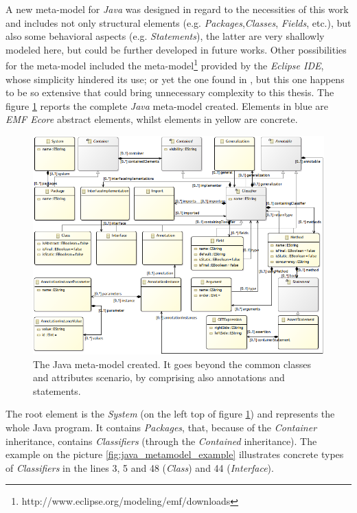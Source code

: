 \documentclass[tuberlin,cic,tc,english,noabntcite]{iiufrgs}
\begin{document}
A new meta-model for \emph{Java} was designed in regard to the necessities of this work and includes not only structural elements (e.g. \emph{Packages},\emph{Classes}, \emph{Fields}, etc.), but also some behavioral aspects (e.g. \emph{Statements}), the latter are very shallowly modeled here, but could be further developed in future works. Other possibilities for the meta-model included the meta-model\footnote{http://www.eclipse.org/modeling/emf/downloads} provided by the \emph{Eclipse IDE}, whose simplicity hindered its use; or yet the one found in \citet{heidenreich2010closing}, but this one happens to be so extensive that could bring unnecessary complexity to this thesis. The figure \ref{fig:java_metamodel} reports the complete \emph{Java} meta-model created. Elements in blue are \emph{EMF Ecore} abstract elements, whilst elements in yellow are concrete.

\begin{figure}[h]
    \caption{The Java meta-model created. It goes beyond the common classes and attributes scenario, by comprising also annotations and statements.}
    \begin{center}
        \includegraphics[width=\textwidth]{javaMetamodel}
    \end{center}
    \label{fig:java_metamodel}
\end{figure}

The root element is the \emph{System} (on the left top of figure \ref{fig:java_metamodel}) and represents the whole Java program. It contains \emph{Packages}, that, because of the \emph{Container} inheritance, contains \emph{Classifiers} (through the \emph{Contained} inheritance). The example on the picture \ref{fig:java_metamodel_example} illustrates concrete types of \emph{Classifiers} in the lines 3, 5 and 48 (\emph{Class}) and 44 (\emph{Interface}).
\end{document}
